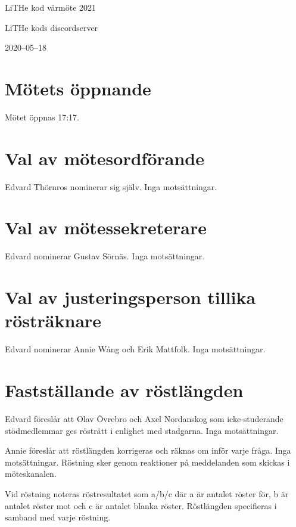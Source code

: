 \documentclass[a4paper]{article}
\begin{document}
\begin{center}
{\huge LiTHe kod vårmöte 2021}\par
\vspace{0.5em}
{\Large LiTHe kods discordserver}\par
{\Large 2020\hspace{0.1em}--\hspace{0.1em}05\hspace{0.1em}--\hspace{0.1em}18}
\vspace{1.5em}
\end{center}

\section{Mötets öppnande}

Mötet öppnas 17:17.

\section{Val av mötesordförande}

Edvard Thörnros nominerar sig själv. Inga motsättningar.

\section{Val av mötessekreterare}

Edvard nominerar Gustav Sörnäs. Inga motsättningar.

\section{Val av justeringsperson tillika rösträknare}

Edvard nominerar Annie Wång och Erik Mattfolk. Inga motsättningar.

\section{Fastställande av röstlängden}

Edvard föreslår att Olav Övrebro och Axel Nordanskog som icke-studerande
stödmedlemmar ges rösträtt i enlighet med stadgarna. Inga motsättningar.

Annie föreslår att röstlängden korrigeras och räknas om inför varje fråga. Inga
motsättningar. Röstning sker genom reaktioner på meddelanden som skickas i
möteskanalen.

Vid röstning noteras röstresultatet som a/b/c där a är antalet röster för, b är
antalet röster mot och c är antalet blanka röster. Röstlängden specifieras i
samband med varje röstning.
\end{document}
